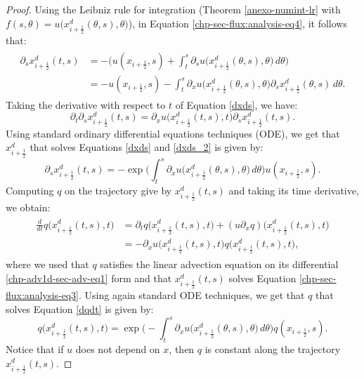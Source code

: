 \begin{proof}
Using the Leibniz rule for integration (Theorem \ref{anexo-numint-lr} with 
$f(s,\theta) = u\big(x^d_{i+\frac{1}{2}}(\theta,s),\theta\big)$),
in Equation \eqref{chp-sec-flux:analysis-eq4}, it follows that:
	\begin{align}
		\begin{split}
			\label{dxds}
			{\partial_s x_{i+\frac{1}{2}}^d} (t,s) &= - \bigg({u}(x_{i+\frac{1}{2}},s) + 
			\int_{t}^{s} {\partial_s}{{u}}\big( x_{i+\frac{1}{2}}^d(\theta,s),\theta\big) \,d\theta \bigg)\\
			&=- {u}(x_{i+\frac{1}{2}},s) -
			\int_{t}^{s} {\partial_x}{{u}}\big( x_{i+\frac{1}{2}}^d(\theta, s),\theta\big) 
			{\partial_s  x_{i+\frac{1}{2}}^d}(\theta, s)\,d\theta.
		\end{split}
	\end{align}
	Taking the derivative with respect to $t$ of Equation \eqref{dxds}, we have:
	\begin{equation}
			\label{dxds_2}
			{\partial_t }{\partial_s  x_{i+\frac{1}{2}}^d}
			(t,s) = {\partial_x}{{u}}\big(x_{i+\frac{1}{2}}^d(t, s), t\big) 
			{\partial _s} x_{i+\frac{1}{2}}^d (t, s).
	\end{equation}
	Using standard ordinary differential equations techniques (ODE), 
	we get that $ x_{i+\frac{1}{2}}^d$ that solves Equations \eqref{dxds} and \eqref{dxds_2}
	is given by:
	\begin{equation}
			\label{xs_int}
			{\partial_s  x_{i+\frac{1}{2}}^d}(t,s) = -
			\exp{\bigg(\int_{t}^{s} {\partial_x}{{u}}\big( x_{i+\frac{1}{2}}^d(\theta,s),\theta\big)  \,d\theta \bigg)}
			{u}(x_{i+\frac{1}{2}},s).
	\end{equation}
	Computing $q$ on the trajectory give by $x_{i+\frac{1}{2}}^d(t,s)$ and taking
	its time derivative, we obtain:
	\begin{align}
		\label{dqdt}
		\begin{split}
			\frac{d}{dt}q\big( x_{i+\frac{1}{2}}^d(t,s),t\big) &= 
			{\partial_t}q\big( x_{i+\frac{1}{2}}^d(t,s),t\big)+
			({u}{\partial_x } 
			q)\big(x_{i+\frac{1}{2}}^d(t,s),t\big) \\
			&= -{\partial_x}{{u}}\big( x_{i+\frac{1}{2}}^d(t,s),t\big) q \big(x_{i+\frac{1}{2}}^d(t,s),t\big),
		\end{split}
	\end{align}
	where we used that $q$ satisfies the linear advection equation on its differential \eqref{chp-adv1d-sec-adv-eq1} form
   and that $x_{i+\frac{1}{2}}^d(t,s)$ solves Equation \eqref{chp-sec-flux:analysis-eq3}.
	Using again standard ODE techniques, we get that $q$ that solves Equation \eqref{dqdt}
	is given by:
	\begin{equation}
			\label{q_int}
			 q\big( x_{i+\frac{1}{2}}^d(t,s),t\big) = 
			\exp{\bigg(-\int_{t}^{s} {\partial_x}{{u}}\big( x_{i+\frac{1}{2}}^d(\theta,s),\theta\big)  \,d\theta \bigg)}
			 q(x_{i+\frac{1}{2}},s).
	\end{equation}
	Notice that if ${u}$ does not depend on $x$, then $q$ is constant along the trajectory $ x_{i+\frac{1}{2}}^d(t,s)$.
	

\end{proof}
